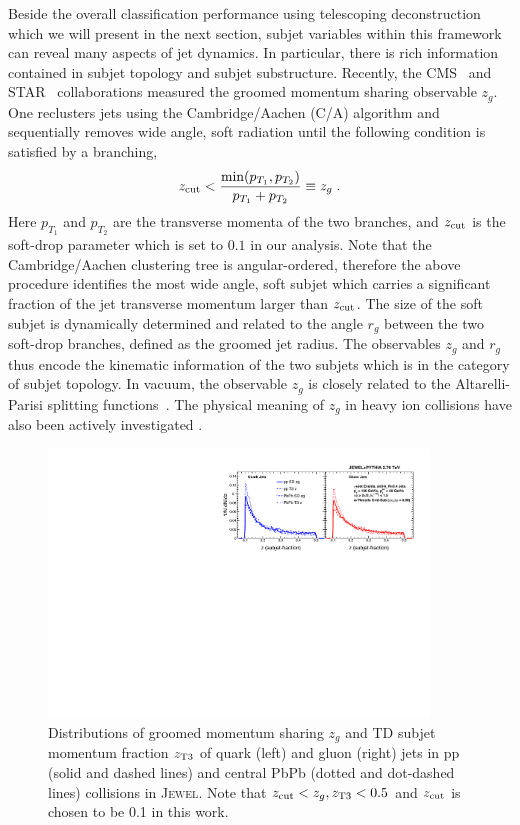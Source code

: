 \documentclass[notoc]{JHEP3}
\begin{document}
Beside the overall classification performance using telescoping deconstruction which we will present in the next section, subjet variables within this framework can reveal many aspects of jet dynamics. In particular, there is rich information contained in subjet topology and subjet substructure. Recently, the CMS~\cite{Sirunyan:2017bsd} and STAR~\cite{Kauder:2017mhg} collaborations measured the groomed momentum sharing observable $z_g$. One reclusters jets using the Cambridge/Aachen (C/A) algorithm \cite{Dokshitzer:1997in,Wobisch:1998wt} and sequentially removes wide angle, soft radiation until the following condition is satisfied by a branching,
\begin{equation}
    z_{\rm cut} < \frac{\min(p_{T_1},p_{T_2})}{p_{T_1}+p_{T_2}} \equiv z_g\;.
\label{SD}
\end{equation}
Here $p_{T_1}$ and $p_{T_2}$ are the transverse momenta of the two branches, and $z_{\rm cut}$ is the soft-drop parameter which is set to $0.1$ in our analysis. Note that the Cambridge/Aachen clustering tree is angular-ordered, therefore the above procedure identifies the most wide angle, soft subjet which carries a significant fraction of the jet transverse momentum larger than $z_{\rm cut}$. The size of the soft subjet is dynamically determined and related to the angle $r_g$ between the two soft-drop branches, defined as the groomed jet radius. The observables $z_g$ and $r_g$ thus encode the kinematic information of the two subjets which is in the category of subjet topology. In vacuum, the observable $z_g$ is closely related to the Altarelli-Parisi splitting functions~\cite{Altarelli:1977zs}. The physical meaning of $z_g$ in heavy ion collisions have also been actively investigated \cite{Chien:2016led,Mehtar-Tani:2016aco,Milhano:2017nzm,Chang:2017gkt,Li:2017wwc}.

\begin{figure}[t]
	   \centering
	   \includegraphics[width=0.9\textwidth]{plots/Comp_z.pdf}
	   \caption{Distributions of groomed momentum sharing $z_g$ and TD subjet momentum fraction $z_{\rm T3}$ of quark (left) and gluon (right) jets in pp (solid and dashed lines) and central PbPb (dotted and dot-dashed lines) collisions in \textsc{Jewel}. Note that $z_{\rm cut}<z_g,z_{\rm T3}<0.5$ and $z_{\rm cut}$ is chosen to be 0.1 in this work.}
\label{fig:comp_z}
\end{figure}
\end{document}
